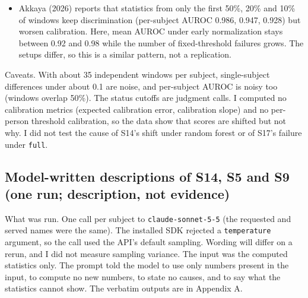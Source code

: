 \documentclass[11pt]{article}
\begin{document}
\begin{itemize}
  improve (RF 0.838, 0.817, 0.801; GB 0.832, 0.855, 0.805; raw 0.846 and
  0.833). The number of flagged subjects rises as the window shrinks (RF
  2, 3, 4, 4; GB 1, 3, 3, 4), mostly subjects whose AUROC stays at 0.93
  or higher. For example S3 under random forest goes from a balanced
  accuracy of 0.94 raw to 0.53, 0.50 and 0.50 at 50\%, 20\% and 10\%,
  with AUROC between 0.93 and 0.99. S14's AUROC is unstable under early
  normalization (RF 0.98 raw, then 0.96, 0.76, 0.70; GB 0.74 raw, then
  0.91, 0.61, 0.56; LR 0.99 raw, then 0.53, 0.92, 0.58).
\item
  Akkaya (2026) reports that statistics from only the first 50\%, 20\%
  and 10\% of windows keep discrimination (per-subject AUROC 0.986,
  0.947, 0.928) but worsen calibration. Here, mean AUROC under early
  normalization stays between 0.92 and 0.98 while the number of
  fixed-threshold failures grows. The setups differ, so this is a
  similar pattern, not a replication.
\end{itemize}

Caveats. With about 35 independent windows per subject, single-subject
differences under about 0.1 are noise, and per-subject AUROC is noisy
too (windows overlap 50\%). The status cutoffs are judgment calls. I
computed no calibration metrics (expected calibration error, calibration
slope) and no per-person threshold calibration, so the data show that
scores are shifted but not why. I did not test the cause of S14's shift
under random forest or of S17's failure under \texttt{full}.

\hypertarget{model-written-descriptions-of-s14-s5-and-s9-one-run-description-not-evidence}{%
\subsection{Model-written descriptions of S14, S5 and S9 (one run;
description, not
evidence)}\label{model-written-descriptions-of-s14-s5-and-s9-one-run-description-not-evidence}}

What was run. One call per subject to \texttt{claude-sonnet-5-5} (the
requested and served names were the same). The installed SDK rejected a
\texttt{temperature} argument, so the call used the API's default
sampling. Wording will differ on a rerun, and I did not measure sampling
variance. The input was the computed statistics only. The prompt told
the model to use only numbers present in the input, to compute no new
numbers, to state no causes, and to say what the statistics cannot show.
The verbatim outputs are in Appendix A.
\end{document}
